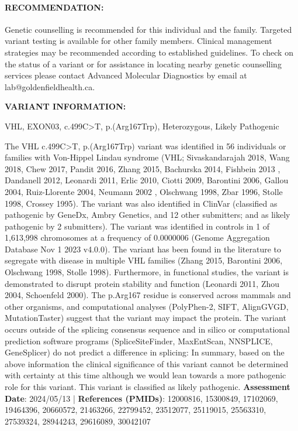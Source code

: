 \documentclass[10pt]{extarticle}
\begin{document}
\paragraph{RECOMMENDATION:} Genetic counselling is recommended for this individual and the family. Targeted variant testing is available for other family members. Clinical management strategies may be recommended according to established guidelines. To check on the status of a variant or for assistance in locating nearby genetic counselling services please contact Advanced Molecular Diagnostics by email at lab@goldenfieldhealth.ca.

{\bf VARIANT INFORMATION:}\\
\hdashrule[0.5ex]{\textwidth}{1pt}{1mm}

\vspace{-1ex}
VHL, EXON03, c.499C>T, p.(Arg167Trp), Heterozygous, Likely Pathogenic

\vspace{-1ex}
\hdashrule[0.5ex]{\textwidth}{1pt}{1mm}

The VHL c.499C>T, p.(Arg167Trp) variant was identified in 56 individuals or families with Von-Hippel Lindau syndrome (VHL; Sivaskandarajah 2018, Wang 2018, Chew 2017, Pandit 2016, Zhang 2015, Bachurska 2014, Fishbein 2013 , Dandanell 2012, Leonardi 2011, Erlic 2010, Ciotti 2009, Barontini 2006, Gallou 2004, Ruiz-Llorente 2004, Neumann 2002 , Olschwang 1998, Zbar 1996, Stolle 1998, Crossey 1995). The variant was also identified in ClinVar (classified as pathogenic by GeneDx, Ambry Genetics, and 12 other submitters; and as likely pathogenic by 2 submitters). The variant was identified in controls in 1 of 1,613,998 chromosomes at a frequency of 0.0000006 (Genome Aggregation Database Nov 1 2023 v4.0.0). The variant has been found in the literature to segregate with disease in multiple VHL families (Zhang 2015, Barontini 2006, Olschwang 1998, Stolle 1998). Furthermore, in functional studies, the variant is demonstrated to disrupt protein stability and function (Leonardi 2011, Zhou 2004, Schoenfeld 2000). The p.Arg167 residue is conserved across mammals and other organisms, and computational analyses (PolyPhen-2, SIFT, AlignGVGD, MutationTaster) suggest that the variant may impact the protein. The variant occurs outside of the splicing consensus sequence and in silico or computational prediction software programs (SpliceSiteFinder, MaxEntScan, NNSPLICE, GeneSplicer) do not predict a difference in splicing: In summary, based on the above information the clinical significance of this variant cannot be determined with certainty at this time although we would lean towards a more pathogenic role for this variant. This variant is classified as likely  pathogenic.
{\bf Assessment Date}: 2024/05/13 | {\bf References (PMIDs)}: 12000816, 15300849, 17102069, 19464396, 20660572, 21463266, 22799452, 23512077, 25119015, 25563310, 27539324, 28944243, 29616089, 30042107
\end{document}
